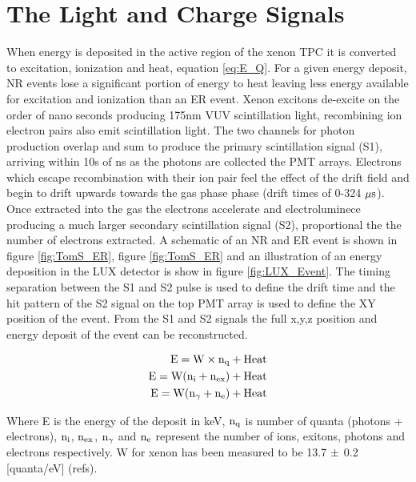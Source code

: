 

\section{The Light and Charge Signals}

When energy is deposited in the active region of the xenon TPC it is converted to excitation, ionization and heat, equation \ref{eq:E_Q}. For a given energy deposit, NR events lose a significant portion of energy to heat leaving less energy available for excitation and ionization than an ER event. Xenon excitons de-excite on the order of nano seconds producing 175nm VUV scintillation light, recombining ion electron pairs also emit scintillation light. The two channels for photon production overlap and sum to produce the primary scintillation signal (S1), arriving within 10s of ns as the photons are collected the  PMT arrays. Electrons which escape recombination with their ion pair feel the effect of the drift field and begin to drift upwards towards the gas phase phase (drift times of 0-324 $\rm \mu s$). Once extracted into the gas the electrons accelerate and electroluminece  producing a much larger secondary scintillation signal (S2), proportional the the number of electrons extracted. A schematic of an NR and ER event is shown in figure \ref{fig:TomS_ER}, figure \ref{fig:TomS_ER} and an illustration of an energy deposition in the LUX detector is show in figure \ref{fig:LUX_Event}. The timing separation between the S1 and S2 pulse is used to define the drift time and the hit pattern of the S2 signal on the top PMT array is used to define the XY position of the event. From the S1 and S2 signals the full x,y,z position and energy deposit of the event can be reconstructed.



\begin{equation}
\begin{split}
\rm E= W\times n_q + Heat \\
\rm E= W (n_i + n_{ex}) + Heat \\
\rm E= W (n_\gamma + n_e) + Heat \\
\label{eq:E_Q}
\end{split}
\end{equation}

Where E is the energy of the deposit in keV, $\rm n_q$ is number of quanta (photons + electrons), $\rm n_i$, $\rm n_{ex}$, $\rm n_\gamma$ and $\rm n_e$ represent the number of ions, exitons, photons and electrons respectively. W for xenon has been measured to be 13.7 $\rm \pm$ 0.2  [quanta/eV] (refs).

